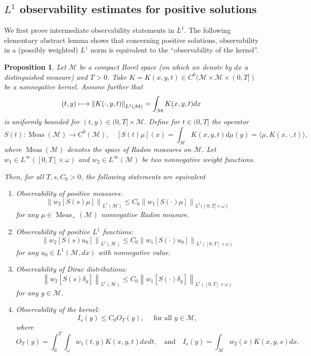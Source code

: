 \documentclass[11pt]{article}
\numberwithin{equation}{section}
\newcommand\mto{\mathchoice{\longmapsto}{\mapsto}{\mapsto}{\mapsto}}
\newtheorem{proposition}[lemma]{Proposition}
\theoremstyle{definition}
\newcommand{\M}{\ensuremath{\mathcal M}}
\DeclareMathOperator{\Meas}{Meas}
\newcommand\nor[2]{\left\|#1\right\|_{#2}}
\begin{document}
\subsection{$L^1$ observability estimates for positive solutions}
\label{s:L1obs}
We first prove intermediate observability statements in $L^1$.
The following elementary abstract lemma shows that concerning positive solutions, observability in a (possibly weighted) $L^1$ norm is equivalent to the ``observability of the kernel''.
\begin{proposition}
\label{propequivobsKernel}
Let $\M$ be a compact Borel space (on which we denote by $dx$ a distinguished measure) and $T>0$. Take $K =K(x,y,t) \in C^0( \M \times \M\times(0,T] )$ be a nonnegative kernel. Assume further that
\[
(t,y) \mto \nor{K(\cdot,y,t)}{L^1(\M)} = \int_\M K(x,y,t) dx
\]
is uniformly bounded for $(t,y)\in (0,T] \times \M$.
Define for $t\in (0,T]$ the operator
\[
S(t) : \Meas(\M) \to C^0(\M), \quad
\left[S(t)\mu \right](x)=\int_{\M} K(x,y,t)d\mu(y) = \langle \mu, K(x,\cdot,t) \rangle,
\]
where $\Meas(\M)$ denotes the space of Radon measures on $\M$.
Let $w_1\in L^{\infty}([0,T]\times \omega)$ and $w_2\in L^{\infty}(\M)$ be two nonnegative weight functions.

Then, for all $T, s,C_0>0$, the following statements are equivalent
\begin{enumerate}
\item \label{enumObsmeasure}Observability of positive measures:
\begin{equation}
\label{e:meas-mu-obs}
\nor{w_2 \left[S(s)\mu\right]}{L^1(\M)}\leq C_0 \nor{w_1 [S(\cdot)\mu]}{L^1((0,T]\times\omega)}
\end{equation}
for any $\mu \in \Meas_+(\M)$ nonnegative Radon measure.
\item \label{enumObsL1} Observability of positive $L^1$ functions:
\[
\nor{w_2 \left[S(s)u_0\right]}{L^1(\M)}\leq C_0 \nor{w_1\left[S(\cdot)u_0\right]}{L^1([0,T]\times \omega)}
\]
for any $u_0\in L^1(\M, dx)$ with nonnegative value.
\item \label{enumObsDirac}Observability of Dirac distributions:
\[
\nor{w_2 \left[S(s) \delta_y \right]}{L^1(\M)}\leq C_0 \nor{w_1 \left[S(\cdot) \delta_y \right]}{L^1([0,T]\times \omega)}
\]
for any $y\in \M$.
\item \label{enumObsKernel}Observability of the kernel:
\[
I_s (y)\leq C_0 O_T(y), \quad \text{ for all } y \in \M,
\]
where
\[
O_T(y)=\int_0^T \int_{\omega} w_1(t,y)K(x,y,t)dx dt, \quad \text{and} \quad
I_s (y)=\int_{\M} w_2(x)K(x,y,s)dx.
\]
\end{enumerate}
\end{proposition}
\end{document}
